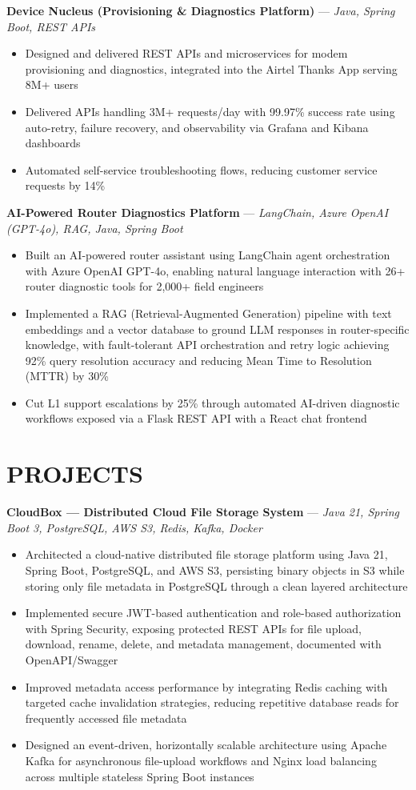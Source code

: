 \documentclass[10.5pt,a4paper]{article}
\newcommand{\proj}[2]{\vspace{4pt}\textbf{#1} \hspace{0.3em}---\hspace{0.3em} \textit{#2}\par\vspace{-1pt}}
\newenvironment{bul}{\begin{itemize}[leftmargin=2.2em,itemsep=2pt,topsep=2pt,parsep=0pt,label=\textbullet]}{\end{itemize}}
\begin{document}
\proj{Device Nucleus (Provisioning \& Diagnostics Platform)}{Java, Spring Boot, REST APIs}
\begin{bul}
\item Designed and delivered REST APIs and microservices for modem provisioning and diagnostics, integrated into the Airtel Thanks App serving 8M+ users
\item Delivered APIs handling 3M+ requests/day with 99.97\% success rate using auto-retry, failure recovery, and observability via Grafana and Kibana dashboards
\item Automated self-service troubleshooting flows, reducing customer service requests by 14\%
\end{bul}

\proj{AI-Powered Router Diagnostics Platform}{LangChain, Azure OpenAI (GPT-4o), RAG, Java, Spring Boot}
\begin{bul}
\item Built an AI-powered router assistant using LangChain agent orchestration with Azure OpenAI GPT-4o, enabling natural language interaction with 26+ router diagnostic tools for 2,000+ field engineers
\item Implemented a RAG (Retrieval-Augmented Generation) pipeline with text embeddings and a vector database to ground LLM responses in router-specific knowledge, with fault-tolerant API orchestration and retry logic achieving 92\% query resolution accuracy and reducing Mean Time to Resolution (MTTR) by 30\%
\item Cut L1 support escalations by 25\% through automated AI-driven diagnostic workflows exposed via a Flask REST API with a React chat frontend
\end{bul}

\section{PROJECTS}
\proj{CloudBox --- Distributed Cloud File Storage System}{Java 21, Spring Boot 3, PostgreSQL, AWS S3, Redis, Kafka, Docker}
\begin{bul}
\item Architected a cloud-native distributed file storage platform using Java 21, Spring Boot, PostgreSQL, and AWS S3, persisting binary objects in S3 while storing only file metadata in PostgreSQL through a clean layered architecture
\item Implemented secure JWT-based authentication and role-based authorization with Spring Security, exposing protected REST APIs for file upload, download, rename, delete, and metadata management, documented with OpenAPI/Swagger
\item Improved metadata access performance by integrating Redis caching with targeted cache invalidation strategies, reducing repetitive database reads for frequently accessed file metadata
\item Designed an event-driven, horizontally scalable architecture using Apache Kafka for asynchronous file-upload workflows and Nginx load balancing across multiple stateless Spring Boot instances
\end{bul}
\end{document}
